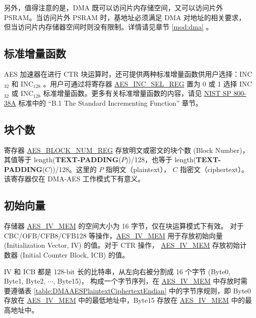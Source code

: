\documentclass[main\_\_CN.tex]{subfiles}
\begin{document}
另外，值得注意的是，DMA 既可以访问片内存储空间，又可以访问片外 PSRAM。当访问片外 PSRAM 时，基地址必须满足 DMA 对地址的相关要求，但当访问片内存储器空间时则没有限制。详情请见章节 \ref{mod:dma} \textit{}。

\subsection{标准增量函数}\label{Label Standard Incrementing Function}

AES 加速器在进行 CTR 块运算时，还可提供两种标准增量函数供用户选择：INC$_{32}$ 和 INC$_{128}$ 。用户可通过将寄存器 \hyperref[regdesc:AESINCSELREG]{AES\_INC\_SEL\_REG} 置为 0 或 1 选择 INC$_{32}$ 或 INC$_{128}$ 标准增量函数。更多有关标准增量函数的内容，请见 \href{https://nvlpubs.nist.gov/nistpubs/Legacy/SP/nistspecialpublication800-38a.pdf}{NIST SP 800-38A} 标准中的 “B.1 The Standard Incrementing Function” 章节。

\subsection{ 块个数}\label{Label Block Number}

寄存器 \hyperref[regdesc:AESBLOCKNUMREG]{AES\_BLOCK\_NUM\_REG} 存放明文或密文的块个数 (Block Number)，其值等于 length({\bfseries TEXT-PADDING}($P$))/128，也等于 length({\bfseries TEXT-PADDING}($C$))/128。这里的 $P$ 指明文（plaintext）， $C$ 指密文（ciphertext）。该寄存器仅在 DMA-AES 工作模式下有意义。

\subsection{初始向量}\label{Label IV}

\label{memdesc:AESIVMEM}存储器 \hyperref[memdesc:AESIVMEM]{AES\_IV\_MEM} 的空间大小为 16 字节，仅在块运算模式下有效。
对于 CBC/OFB/CFB8/CFB128 等操作，\hyperref[memdesc:AESIVMEM]{AES\_IV\_MEM} 用于存放初始向量 (Initialization Vector, IV) 的值。对于 CTR 操作， \hyperref[memdesc:AESIVMEM]{AES\_IV\_MEM}  存放初始计数器 (Initial Counter Block, ICB) 的值。

IV 和 ICB 都是 128-bit 长的比特串，从左向右被分割成 16 个字节 (Byte0, Byte1, Byte2, \begin{math}\cdots\end{math}, Byte15)， 构成一个字节序列，在 \hyperref[memdesc:AESIVMEM]{AES\_IV\_MEM} 中存放时需要遵循表 \ref{table:DMAAESPlaintextCiphertextEndian} 中的字节序规则，即 Byte0 存放在 \hyperref[memdesc:AESIVMEM]{AES\_IV\_MEM} 中的最低地址中，Byte15 存放在 \hyperref[memdesc:AESIVMEM]{AES\_IV\_MEM} 中的最高地址中。
\end{document}
